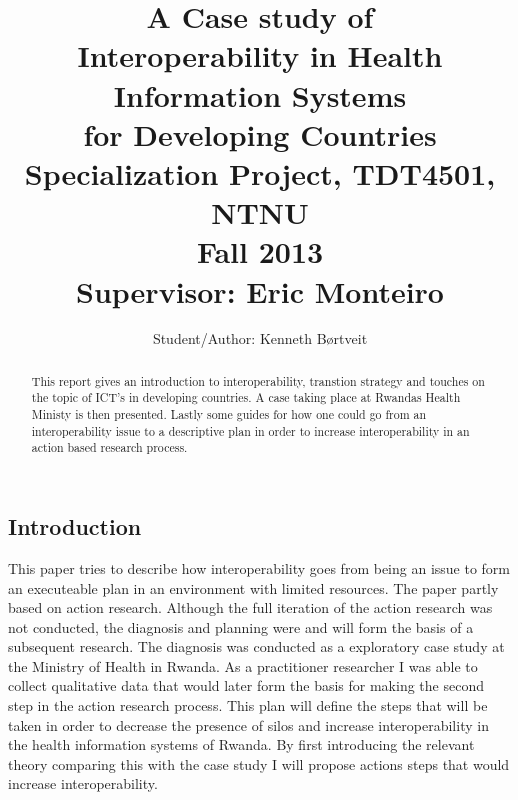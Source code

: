 \documentclass[12pt, a4paper]{report}
\title{{\Huge A Case study of \\ Interoperability in Health Information Systems \\ for Developing Countries} \\ Specialization Project, TDT4501, NTNU \\ Fall 2013 \\ {\small Supervisor: Eric Monteiro}}
\author{Student/Author: Kenneth Børtveit}
\begin{document}
\begin{onehalfspacing}
\maketitle
\tableofcontents
\listoffigures

\printnomenclature
\begin{abstract}
This report gives an introduction to interoperability, transtion strategy and touches on the topic of ICT's in developing countries.
A case taking place at Rwandas Health Ministy is then presented.
Lastly some guides for how one could go from an interoperability issue to a descriptive plan in order to increase interoperability in an action based research process.
\end{abstract}
\chapter{Introduction}
This paper tries to describe how interoperability goes from being an issue to form an executeable plan in an environment with limited resources.
The paper partly based on action research.
Although the full iteration of the action research was not conducted, the diagnosis and planning were and will form the basis of a subsequent research.
The diagnosis was conducted as a exploratory case study at the Ministry of Health in Rwanda.
As a practitioner researcher I was able to collect qualitative data that would later form the basis for making the second step in the action research process.
This plan will define the steps that will be taken in order to decrease the presence of silos and increase interoperability in the health information systems of Rwanda.
By first introducing the relevant theory comparing this with the case study I will propose actions steps that would increase interoperability.
 




\end{onehalfspacing}	
\end{document}
